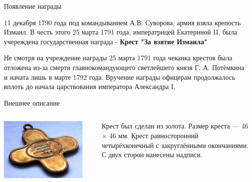 \begin{frame}{Появление награды}

11 декабря 1790 года под командыванием А.В. Суворова, армия взяла крепость Измаил. В честь этого 25 марта 1791 года, императрицей Екатериной II, была учереждена государственная награда - \textbf{Крест "За взятие Измаила"}

\end{frame}
\begin{frame}{}
	Не смотря на учреждение награды 25 марта 1791 года чеканка крестов была отложена из-за смерти главнокомандующего светлейшего князя Г. А. Потёмкина и начата лишь в марте 1792 года. Вручение награды офицерам продолжалось вплоть до начала царствования императора Александра I.
\end{frame}
\begin{frame}{Внешнее описание}
	\begin{columns}
		\begin{column}{0.45\textwidth}
			\includegraphics[width=0.9\textwidth]{images/medal-1.jpg}
		\end{column}
		\begin{column}{0.45\textwidth}

			Крест был сделан из золота. Размер креста — 46 × 46 мм. Крест равносторонний четырёхконечный с закруглёнными окончаниями. С двух сторон нанесены надписи.

		\end{column}
	\end{columns}
\end{frame}
